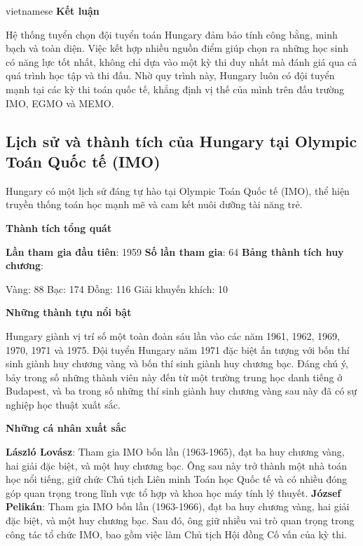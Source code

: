 \documentclass{article}
\begin{document}
\begin{otherlanguage*}{vietnamese}
\textbf{Kết luận}

Hệ thống tuyển chọn đội tuyển toán Hungary đảm bảo tính công bằng, minh bạch và toàn diện.
Việc kết hợp nhiều nguồn điểm giúp chọn ra những học sinh có năng lực tốt nhất, không chỉ dựa vào một kỳ thi duy nhất mà đánh giá qua cả quá trình học tập và thi đấu.
Nhờ quy trình này, Hungary luôn có đội tuyển mạnh tại các kỳ thi toán quốc tế, khẳng định vị thế của mình trên đấu trường IMO, EGMO và MEMO.

\newpage

\subsection{Lịch sử và thành tích của Hungary tại Olympic Toán Quốc tế (IMO)}

Hungary có một lịch sử đáng tự hào tại Olympic Toán Quốc tế (IMO), thể hiện truyền thống toán học mạnh mẽ và cam kết nuôi dưỡng tài năng trẻ.

\textbf{Thành tích tổng quát}

\begin{itemize}[topsep=0pt, partopsep=0pt, itemsep=0pt]
    \ii \textbf{Lần tham gia đầu tiên}: 1959
    \ii \textbf{Số lần tham gia}: 64
    \ii \textbf{Bảng thành tích huy chương}:
    \begin{itemize}[topsep=0pt, partopsep=0pt, itemsep=0pt]
        \ii Vàng: 88
        \ii Bạc: 174
        \ii Đồng: 116
        \ii Giải khuyến khích: 10
    \end{itemize}
\end{itemize}

\textbf{Những thành tựu nổi bật}
\begin{itemize}[topsep=0pt, partopsep=0pt, itemsep=0pt]
    \ii Hungary giành vị trí số một toàn đoàn sáu lần vào các năm 1961, 1962, 1969, 1970, 1971 và 1975.
    \ii Đội tuyển Hungary năm 1971 đặc biệt ấn tượng với bốn thí sinh giành huy chương vàng và bốn thí sinh giành huy chương bạc.
    Đáng chú ý, bảy trong số những thành viên này đến từ một trường trung học danh tiếng ở Budapest, và ba trong số những thí sinh giành huy chương vàng sau này đã có sự nghiệp học thuật xuất sắc.
\end{itemize}

\textbf{Những cá nhân xuất sắc}

\begin{itemize}[topsep=0pt, partopsep=0pt, itemsep=0pt]
    \ii \textbf{László Lovász}: Tham gia IMO bốn lần (1963-1965), đạt ba huy chương vàng, hai giải đặc biệt, và một huy chương bạc. 
    Ông sau này trở thành một nhà toán học nổi tiếng, giữ chức Chủ tịch Liên minh Toán học Quốc tế và có nhiều đóng góp quan trọng trong lĩnh vực tổ hợp và khoa học máy tính lý thuyết.
    \ii \textbf{József Pelikán}: Tham gia IMO bốn lần (1963-1966), đạt ba huy chương vàng, hai giải đặc biệt, và một huy chương bạc.  
    Sau đó, ông giữ nhiều vai trò quan trọng trong công tác tổ chức IMO, bao gồm việc làm Chủ tịch Hội đồng Cố vấn của kỳ thi.
\end{itemize}


\end{otherlanguage*}
\end{document}
